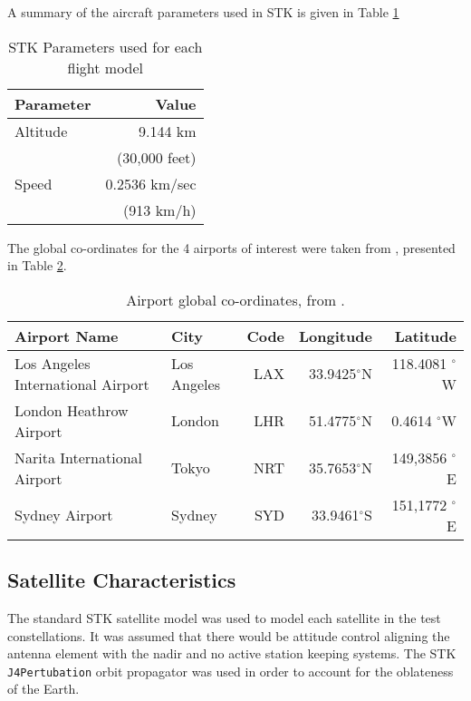 A summary of the aircraft parameters used in STK is given in Table \ref{tab:flightSTKParams}

\begin{table}[H]
  \centering
  \caption{STK Parameters used for each flight model}
    \begin{tabular}{lr}
    \toprule
    Parameter & Value\\
    \midrule
    Altitude & 9.144 km  \\
    	& (30,000 feet)\\
    Speed & 0.2536 km/sec \\
    	& (913 km/h) \\	
    \bottomrule
    \end{tabular}%
  \label{tab:flightSTKParams}%
\end{table}%

The global co-ordinates for the 4 airports of interest were taken from \cite{Open}, presented in Table \ref{tab:airportCoords}.

\begin{table}[H]
  \centering
  \caption[Airport global co-ordinates]{Airport global co-ordinates, from \cite{Open}.}
    \begin{tabular}{p{4cm}lrrr}
    \toprule
    Airport Name & City & Code & Longitude & Latitude \\
    \midrule
    Los  Angeles International Airport & Los Angeles & LAX   & 33.9425$^\circ$N & 118.4081 $^\circ$W  \\
    London Heathrow Airport & London & LHR   & 51.4775$^\circ$N & 0.4614 $^\circ$W  \\
   	Narita International Airport & Tokyo & NRT   & 35.7653$^\circ$N & 149,3856 $^\circ$E   \\
    Sydney Airport & Sydney & SYD   & 33.9461$^\circ$S & 151,1772 $^\circ$E  \\
    \bottomrule
    \end{tabular}%
  \label{tab:airportCoords}%
\end{table}%

\subsection{Satellite Characteristics}
The standard STK satellite model was used to model each satellite in the test constellations. It was assumed that there would be attitude control aligning the antenna element with the nadir and no active station keeping systems. The STK \Verb|J4Pertubation| orbit propagator was used in order to account for the oblateness of the Earth.